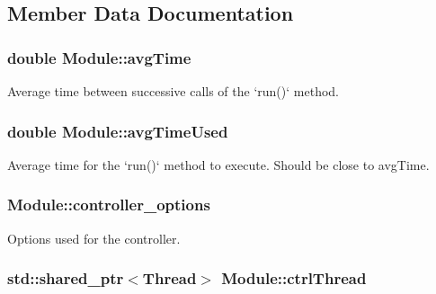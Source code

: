 \subsection{\-Member \-Data \-Documentation}
\hypertarget{classModule_a1a20dbf0d18e5020ad85d38a0ba22b88}{
\subsubsection[{avg\-Time}]{\setlength{\rightskip}{0pt plus 5cm}double {\bf \-Module\-::avg\-Time}}}\label{classModule_a1a20dbf0d18e5020ad85d38a0ba22b88}
\-Average time between successive calls of the `run()` method. \hypertarget{classModule_a5baf8260eb8a45ebbb75474f2b277edc}{
\subsubsection[{avg\-Time\-Used}]{\setlength{\rightskip}{0pt plus 5cm}double {\bf \-Module\-::avg\-Time\-Used}}}\label{classModule_a5baf8260eb8a45ebbb75474f2b277edc}
\-Average time for the `run()` method to execute. \-Should be close to avg\-Time. \hypertarget{classModule_a04156183c6e15f118595e3637ab5372f}{
\subsubsection[{controller\-\_\-options}]{ {\bf \-Module\-::controller\-\_\-options}}}\label{classModule_a04156183c6e15f118595e3637ab5372f}
\-Options used for the controller. \hypertarget{classModule_a39346aa2e2a00801e07f4c127ff004ba}{
\subsubsection[{ctrl\-Thread}]{\setlength{\rightskip}{0pt plus 5cm}std\-::shared\-\_\-ptr$<${\bf \-Thread}$>$ {\bf \-Module\-::ctrl\-Thread}}}\label{classModule_a39346aa2e2a00801e07f4c127ff004ba}
